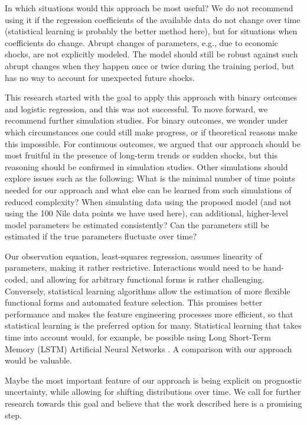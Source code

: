 \documentclass{article}
\begin{document}
In which situations would this approach be most useful? We do not recommend using it if the regression coefficients of the available data do not change over time (statistical learning is probably the better method here), but for situations when coefficients do change. Abrupt changes of parameters, e.g., due to economic shocks, are not explicitly modeled. The model should still be robust against such abrupt changes when they happen once or twice during the training period, but has no way to account for unexpected future shocks.

This research started with the goal to apply this approach with binary outcomes and logistic regression, and this was not successful. To move forward, we recommend further simulation studies. For binary outcomes, we wonder under which circumstances one could still make progress, or if theoretical reasons make this impossible. For continuous outcomes, we argued that our approach should be most fruitful in the presence of long-term trends or sudden shocks, but this reasoning should be confirmed in simulation studies. Other simulations should explore issues such as the following: What is the minimal number of time points needed for our approach and what else can be learned from such simulations of reduced complexity? When simulating data using the proposed model (and not using the 100 Nile data points we have used here), can additional, higher-level model parameters be estimated consistently? Can the parameters still be estimated if the true parameters fluctuate over time?

Our observation equation, least-squares regression, assumes linearity of parameters, making it rather restrictive. Interactions would need to be hand-coded, and allowing for arbitrary functional forms is rather challenging. Conversely, statistical learning algorithms allow the estimation of more flexible functional forms and automated feature selection. This promises better performance and makes the feature engineering processes more efficient, so that statistical learning is the preferred option for many. Statistical learning that takes time into account would, for example, be possible using Long Short-Term Memory (LSTM) Artificial Neural Networks \citep{hochreiter_long_1997}. A comparison with our approach would be valuable.

Maybe the most important feature of our approach is being explicit on prognostic uncertainty, while allowing for shifting distributions over time. We call for further research towards this goal and believe that the work described here is a promising step.
\end{document}
